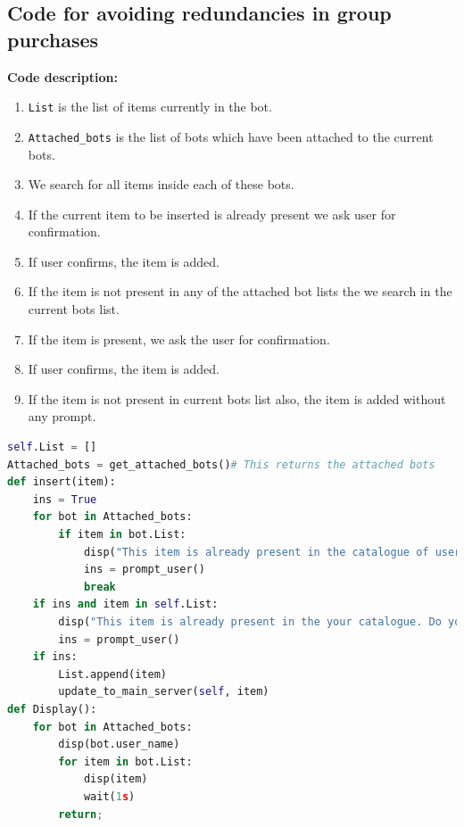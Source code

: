 \documentclass{article}
\begin{document}
\subsection{Code for avoiding redundancies in group purchases}
\label{code:l}
\textbf{Code description: }
\begin{enumerate}
\item \lstinline[language=Python]{List} is the list of items currently in the bot.
\item \lstinline[language=Python]{Attached_bots} is the list of bots which have been attached to the current bots.
\item We search for all items inside each of these bots.
\item If the current item to be inserted is already present we ask user for confirmation.
\item If user confirms, the item is added.
\item If the item is not present in any of the attached bot lists the we search in the current bots list.
\item If the item is present, we ask the user for confirmation.
\item If user confirms, the item is added.
\item If the item is not present in current bots list also, the item is added without any prompt.
\end{enumerate}
\begin{lstlisting}[language=Python, caption=Avoiding redundancies in group purchases]
self.List = []
Attached_bots = get_attached_bots()# This returns the attached bots
def insert(item):
    ins = True
    for bot in Attached_bots:
        if item in bot.List:
            disp("This item is already present in the catalogue of user:", bot.user_name,"Do you want to add it")
            ins = prompt_user()
            break
    if ins and item in self.List: 
        disp("This item is already present in the your catalogue. Do you want to add it")
        ins = prompt_user()    
    if ins:
        List.append(item)
        update_to_main_server(self, item)    
def Display():
    for bot in Attached_bots:
        disp(bot.user_name)
        for item in bot.List:
            disp(item)
            wait(1s)
        return;    
        
\end{lstlisting}

\end{document}
